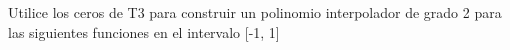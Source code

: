 Utilice los ceros de T3 para construir un polinomio interpolador de grado 2 para las siguientes funciones en el intervalo [-1, 1]
